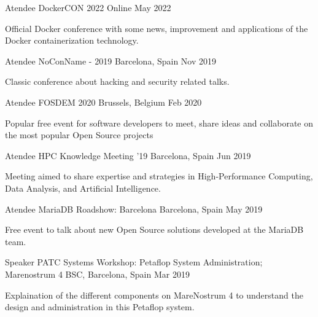 
\begin{cvhonors}

\cventry
{Atendee } %
{DockerCON 2022} %
{Online} %
{May 2022} %
{ %
	\begin{cvitems}
		\item {Official Docker conference with some news, improvement and applications of the Docker containerization technology.}
	\end{cvitems}
}

\cventry
{Atendee } %
{NoConName - 2019} %
{Barcelona, Spain} %
{Nov 2019} %
{ %
	\begin{cvitems}
		\item { Classic conference about hacking and security related talks.}
	\end{cvitems}
}

\cventry
{Atendee } %
{FOSDEM 2020} %
{Brussels, Belgium} %
{Feb 2020} %
{ %
	\begin{cvitems}
		\item {Popular free event for software developers to meet, share ideas and collaborate on the most popular Open Source projects}
	\end{cvitems}
}

\cventry
{Atendee}
{HPC Knowledge Meeting '19}
{Barcelona, Spain} 
{Jun 2019} 
{
	\begin{cvitems}
        \item { Meeting aimed to share expertise and strategies in High-Performance Computing, Data Analysis, and Artificial Intelligence.}
	\end{cvitems}
}

\cventry
{Atendee } %
{MariaDB Roadshow: Barcelona} %
{Barcelona, Spain} %
{May 2019} %
{ %
	\begin{cvitems}
		\item { Free event to talk about new Open Source solutions developed at the MariaDB team.}
	\end{cvitems}
}

\cventry
{Speaker } %
{PATC Systems Workshop: Petaflop System Administration; Marenostrum 4} 
{BSC, Barcelona, Spain} %
{Mar 2019} %
{ %
	\begin{cvitems}
		\item {Explaination of the different components on MareNostrum 4 to understand the design and administration in this Petaflop system.}
	\end{cvitems}
}


\end{cvhonors}
